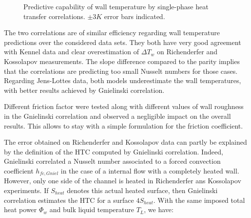 \begin{figure}[h!]
\centering
{} 
\caption{Predictive capability of wall temperature by single-phase heat transfer correlations. $\pm 3K$ error bars indicated.}
\label{fig:dittus_gniel_htc}
\end{figure}

\npar
The two correlations are of similar efficiency regarding wall temperature predictions over the considered data sets. They both have very good agreement with Kennel data and clear overestimation of $\Delta T_{w}$ on Richenderfer and Kossolapov measurements. The slope difference compared to the parity implies that the correlations are predicting too small Nusselt numbers for those cases. Regarding Jens-Lottes data, both models underestimate the wall temperatures, with better results achieved by Gnielinski correlation.

\begin{remark*}{}
Different friction factor were tested along with different values of wall roughness in the Gnielinski correlation and observed a negligible impact on the overall results. This allows to stay with a simple formulation for the friction coefficient.

\end{remark*}

\npar

The error obtained on Richenderfer and Kossolapov data can partly be explained by the definition of the HTC computed by Gnielinski correlation. Indeed, Gnielinski correlated a Nusselt number associated to a forced convection coefficient $h_{fc,Gniel}$ in the case of a internal flow with a completely heated wall. However, only one side of the channel is heated in Richenderfer ans Kossolapov experiments. If $S_{heat}$ denotes this actual heated surface, then Gnielinski correlation estimates the HTC for a surface $4S_{heat}$. With the same imposed total heat power $\Phi_{w}$ and bulk liquid temperature $T_{L}$, we have:

